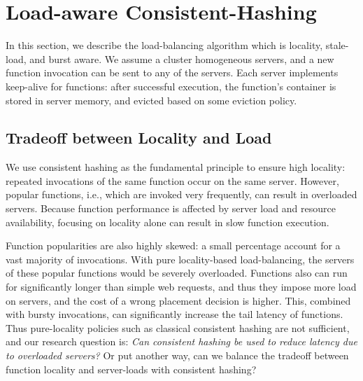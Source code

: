 \section{Load-aware Consistent-Hashing} %
\label{sec:chrlu}

In this section, we describe the load-balancing algorithm which is locality, stale-load, and burst aware.
We assume a cluster  homogeneous servers, and 
a new function invocation can be sent to any of the servers.
Each server implements keep-alive for functions: after successful execution, the function's container is stored in server memory, and evicted based on some eviction policy. %


\vspace*{-0.2cm}
\subsection{Tradeoff between Locality and Load}

We use consistent hashing as the fundamental principle to ensure high locality: repeated invocations of the same function occur on the same server. 
However, popular functions, i.e., which are invoked very frequently, can result in overloaded servers.
Because function performance is affected by server load and resource availability, focusing on locality alone can result in slow function execution.

Function popularities are also highly skewed: a small percentage account for a vast majority of invocations.
With pure locality-based load-balancing, the servers of these popular functions would be severely overloaded.
Functions also can run for significantly longer than simple web requests, and thus they impose more load on servers, and the cost of a wrong placement decision is higher. 
This, combined with bursty invocations, can significantly increase the tail latency of functions. 
Thus pure-locality policies such as classical consistent hashing are not sufficient, and 
our research question is: \emph{Can consistent hashing be used to reduce latency due to overloaded servers?} 
Or put another way, can we balance the tradeoff between function locality and server-loads with consistent hashing? 


